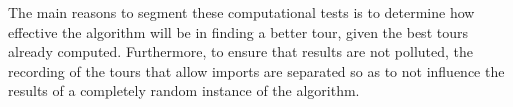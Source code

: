 \documentclass[12pt]{article}
\begin{document}
The main reasons to segment these computational tests is to determine how effective the algorithm will be in finding a better tour, given the best tours already computed. Furthermore, to ensure that results are not polluted, the recording of the tours that allow imports are separated so as to not influence the results of a completely random instance of the algorithm.
\end{document}
